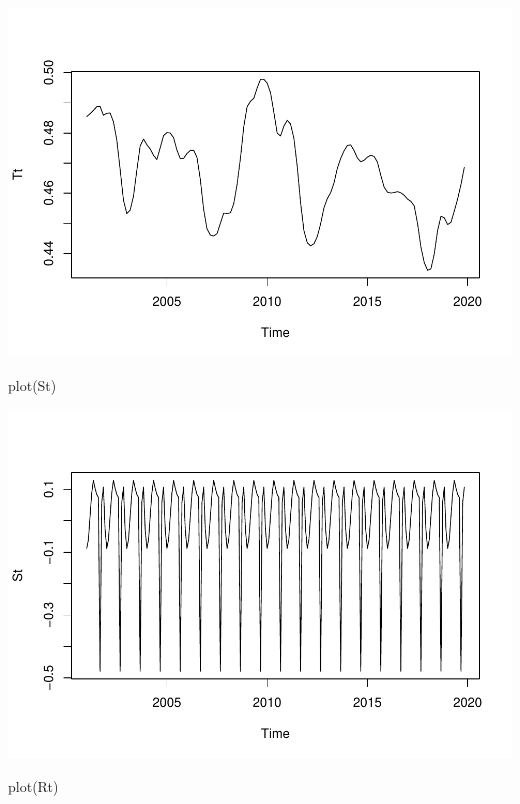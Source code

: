 \documentclass[10pt]{report}
\newenvironment{Shaded}{\begin{snugshade}}{\end{snugshade}}
\newcommand{\FunctionTok}[1]{\textcolor[rgb]{0.00,0.00,0.00}{#1}}
\newcommand{\NormalTok}[1]{#1}
\begin{document}
\includegraphics{unnamed-chunk-16-1.pdf}

\begin{Shaded}
\begin{Highlighting}[]
\FunctionTok{plot}\NormalTok{(St)}
\end{Highlighting}
\end{Shaded}

\includegraphics{unnamed-chunk-16-2.pdf}

\begin{Shaded}
\begin{Highlighting}[]
\FunctionTok{plot}\NormalTok{(Rt)}
\end{Highlighting}
\end{Shaded}
\end{document}
